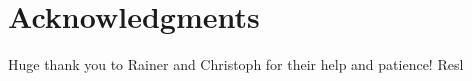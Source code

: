 \chapter*{Acknowledgments}
\thispagestyle{plain}

Huge thank you to Rainer and Christoph for their help and patience!
Resl 

